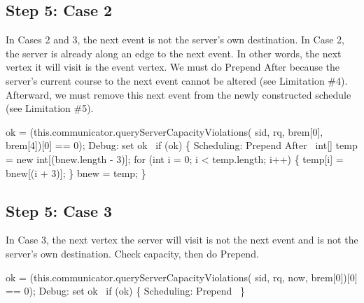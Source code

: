\subsection{Step 5: Case 2}

In Cases 2 and 3, the next event is not the server's own destination. In Case
2, the server is already along an edge to the next event. In other words, the
next vertex it will visit is the event vertex. We must do Prepend After because
the server's current course to the next event cannot be altered (see Limitation
\#4). Afterward, we must remove this next event from the newly constructed
schedule (see Limitation \#5).

\nwenddocs{}\endmoddef\nwstartdeflinemarkup{}\nwenddeflinemarkup
ok = (this.communicator.queryServerCapacityViolations(
    sid, rq, brem[0], brem[4])[0] == 0);
\LA{}Debug: set ok~{\nwtagstyle{}}\RA{}
if (ok) \{
  \LA{}Scheduling: Prepend After~{\nwtagstyle{}}\RA{}
  int[] temp = new int[(bnew.length - 3)];
  for (int i = 0; i < temp.length; i++) \{
    temp[i] = bnew[(i + 3)];
  \}
  bnew = temp;
\}
\nwendcode{}\nwdocspar

\subsection{Step 5: Case 3}

In Case 3, the next vertex the server will visit is not the next event and
is not the server's own destination. Check capacity, then do Prepend.

\nwenddocs{}\endmoddef\nwstartdeflinemarkup{}\nwenddeflinemarkup
ok = (this.communicator.queryServerCapacityViolations(
    sid, rq, now, brem[0])[0] == 0);
\LA{}Debug: set ok~{\nwtagstyle{}}\RA{}
if (ok) \{
  \LA{}Scheduling: Prepend~{\nwtagstyle{}}\RA{}
\}
\nwendcode{}\nwdocspar

